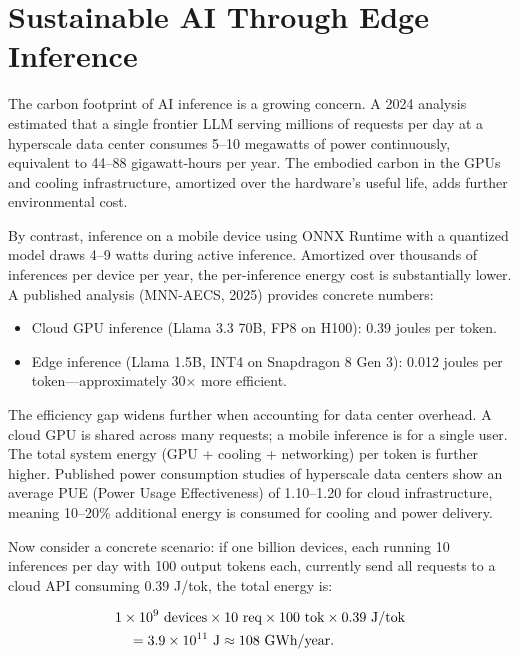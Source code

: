 \documentclass[12pt, letterpaper, twoside]{report}
\begin{document}
\section{Sustainable AI Through Edge Inference}
\label{sec:sustainable_ai}

The carbon footprint of AI inference is a growing concern. A 2024 analysis estimated that a single frontier LLM serving millions of requests per day at a hyperscale data center consumes 5--10 megawatts of power continuously, equivalent to 44--88 gigawatt-hours per year. The embodied carbon in the GPUs and cooling infrastructure, amortized over the hardware's useful life, adds further environmental cost.

By contrast, inference on a mobile device using ONNX Runtime with a quantized model draws 4--9 watts during active inference. Amortized over thousands of inferences per device per year, the per-inference energy cost is substantially lower. A published analysis (MNN-AECS, 2025) provides concrete numbers:

\begin{itemize}[itemsep=1pt, topsep=2pt, parsep=0pt]
\item Cloud GPU inference (Llama 3.3 70B, FP8 on H100): 0.39 joules per token.
\item Edge inference (Llama 1.5B, INT4 on Snapdragon 8 Gen 3): 0.012 joules per token---approximately 30$\times$ more efficient.
\end{itemize}

The efficiency gap widens further when accounting for data center overhead. A cloud GPU is shared across many requests; a mobile inference is for a single user. The total system energy (GPU + cooling + networking) per token is further higher. Published power consumption studies of hyperscale data centers show an average PUE (Power Usage Effectiveness) of 1.10--1.20 for cloud infrastructure, meaning 10--20\% additional energy is consumed for cooling and power delivery.

Now consider a concrete scenario: if one billion devices, each running 10 inferences per day with 100 output tokens each, currently send all requests to a cloud API consuming 0.39 J/tok, the total energy is:

\begin{align}
&1 \times 10^9 \text{ devices} \times 10 \text{ req} \times 100 \text{ tok} \times 0.39 \text{ J/tok} \notag\\
&\quad = 3.9 \times 10^{11} \text{ J} \approx 108 \text{ GWh/year}. \notag
\end{align}
\end{document}
